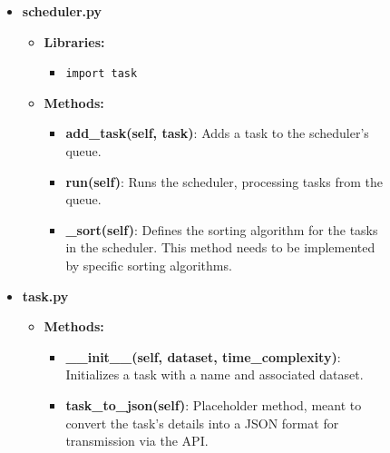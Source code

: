 \documentclass{article}
\begin{document}
\begin{figure}[h!]
\begin{itemize}
        \item \textbf{scheduler.py}
        \begin{itemize}
            \item \textbf{Libraries:}
            \begin{itemize}
                \item \texttt{import task}
            \end{itemize}
            \item \textbf{Methods:}
            \begin{itemize}
                \item \textbf{add\_task(self, task)}: Adds a task to the scheduler's queue.
                \item \textbf{run(self)}: Runs the scheduler, processing tasks from the queue.
                \item \textbf{\_sort(self)}: Defines the sorting algorithm for the tasks in the scheduler. This method needs to be implemented by specific sorting algorithms.
            \end{itemize}
        \end{itemize}

        \item \textbf{task.py}
        \begin{itemize}
            \item \textbf{Methods:}
            \begin{itemize}
                \item \textbf{\_\_init\_\_(self, dataset, time\_complexity)}: Initializes a task with a name and associated dataset.
                
                \item \textbf{task\_to\_json(self)}: Placeholder method, meant to convert the task's details into a JSON format for transmission via the API.
            \end{itemize}
        \end{itemize}
    \end{itemize}

\end{figure}
\end{document}
